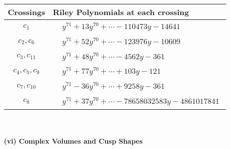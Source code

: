 \documentclass[1p]{elsarticle_modified}
\theoremstyle{definition}
\begin{document}
\begin{tabular}{m{50pt}|m{274pt}}
Crossings & \hspace{64pt}Riley Polynomials at each crossing \\
\hline $$\begin{aligned}c_{1}\end{aligned}$$&$\begin{aligned}
&y^{71}+13 y^{70}+\cdots-110473 y-14641
\end{aligned}$\\
\hline $$\begin{aligned}c_{2},c_{6}\end{aligned}$$&$\begin{aligned}
&y^{71}+52 y^{70}+\cdots-123976 y-10609
\end{aligned}$\\
\hline $$\begin{aligned}c_{3},c_{11}\end{aligned}$$&$\begin{aligned}
&y^{71}+48 y^{70}+\cdots-4562 y-361
\end{aligned}$\\
\hline $$\begin{aligned}c_{4},c_{5},c_{9}\end{aligned}$$&$\begin{aligned}
&y^{71}+77 y^{70}+\cdots+103 y-121
\end{aligned}$\\
\hline $$\begin{aligned}c_{7},c_{10}\end{aligned}$$&$\begin{aligned}
&y^{71}-36 y^{70}+\cdots+9258 y-361
\end{aligned}$\\
\hline $$\begin{aligned}c_{8}\end{aligned}$$&$\begin{aligned}
&y^{71}+37 y^{70}+\cdots-78658032583 y-4861017841
\end{aligned}$\\
\hline
\end{tabular}\\~\\
\newpage\flushleft \textbf{(vi) Complex Volumes and Cusp Shapes}
\end{document}
